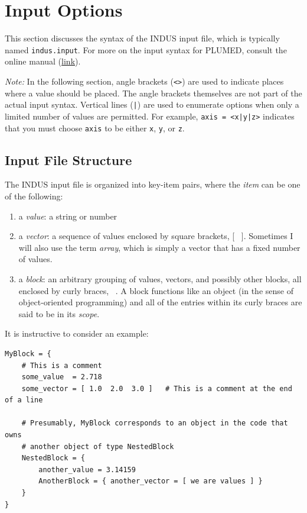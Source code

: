 \documentclass[11pt,notitlepage]{article}
\newcommand{\plumedmanual}[1][link]{\href{https://plumed.github.io/doc.html}{#1}}
\begin{document}

\section{Input Options}{\label{sec:input}}

This section discusses the syntax of the INDUS input file, which is typically named \texttt{indus.input}. For more on the input syntax for PLUMED, consult the online manual (\plumedmanual).

\emph{Note:} In the following section, angle brackets (\texttt{<>}) are used to indicate places where a value should be placed. The angle brackets themselves are not part of the actual input syntax. Vertical lines (\texttt{|}) are used to enumerate options when only a limited number of values are permitted. For example, \texttt{axis = <x|y|z>} indicates that you must choose \texttt{axis} to be either \texttt{x}, \texttt{y}, or \texttt{z}.


\subsection{Input File Structure}

The INDUS input file is organized into key-item pairs, where the \emph{item} can be one of the following: 
\begin{enumerate}
	\item a \emph{value}: a string or number
	\item a \emph{vector}: a sequence of values enclosed by square brackets, [ \ ]. Sometimes I will also use the term \emph{array}, which is simply a vector that has a fixed number of values.
	\item a \emph{block}: an arbitrary grouping of values, vectors, and possibly other blocks, all enclosed by curly braces, { \ }. A block functions like an object (in the sense of object-oriented programming) and all of the entries within its curly braces are said to be in its \emph{scope}.
\end{enumerate}

It is instructive to consider an example:

\begin{lstlisting}
MyBlock = {
	# This is a comment
	some_value  = 2.718
	some_vector = [ 1.0  2.0  3.0 ]   # This is a comment at the end of a line
	
	# Presumably, MyBlock corresponds to an object in the code that owns 
	# another object of type NestedBlock
	NestedBlock = {
		another_value = 3.14159
		AnotherBlock = { another_vector = [ we are values ] }
	}
}
\end{lstlisting}
\end{document}
